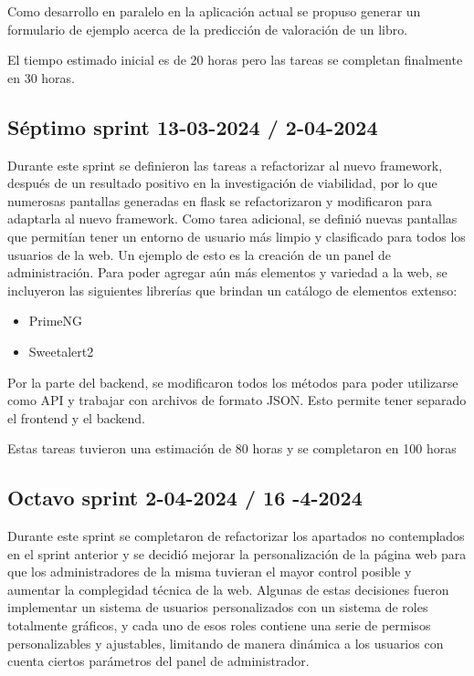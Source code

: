 Como desarrollo en paralelo en la aplicación actual se propuso generar un formulario de ejemplo acerca de la predicción de valoración de un libro.

El tiempo estimado inicial es de 20 horas pero las tareas se completan finalmente en 30 horas.

\subsection{Séptimo sprint 13-03-2024 / 2-04-2024}
Durante este sprint se definieron las tareas a refactorizar al nuevo framework, después de un resultado positivo en la investigación de viabilidad, por lo que numerosas pantallas generadas en flask se refactorizaron y modificaron para adaptarla al nuevo framework. 
Como tarea adicional, se definió nuevas pantallas que permitían tener un entorno de usuario más limpio y clasificado para todos los usuarios de la web. Un ejemplo de esto es la creación de un panel de administración.
Para poder agregar aún más elementos y variedad a la web, se incluyeron las siguientes librerías que brindan un catálogo de elementos extenso:
\begin{itemize}
    \item PrimeNG
    \item Sweetalert2
\end{itemize}

Por la parte del backend, se modificaron todos los métodos para poder utilizarse como API y trabajar con archivos de formato JSON. Esto permite tener separado el frontend y el backend.

Estas tareas tuvieron una estimación de 80 horas y se completaron en 100 horas


\subsection{Octavo sprint 2-04-2024 / 16 -4-2024}
Durante este sprint se completaron de refactorizar los apartados no contemplados en el sprint anterior y se decidió mejorar la personalización de la página web para que los administradores de la misma tuvieran el mayor control posible y aumentar la complegidad técnica de la web.
Algunas de estas decisiones fueron implementar un sistema de usuarios personalizados con un sistema de roles totalmente gráficos, y cada uno de esos roles contiene una serie de permisos personalizables y ajustables, limitando de manera dinámica a los usuarios con cuenta ciertos parámetros del panel de administrador.

